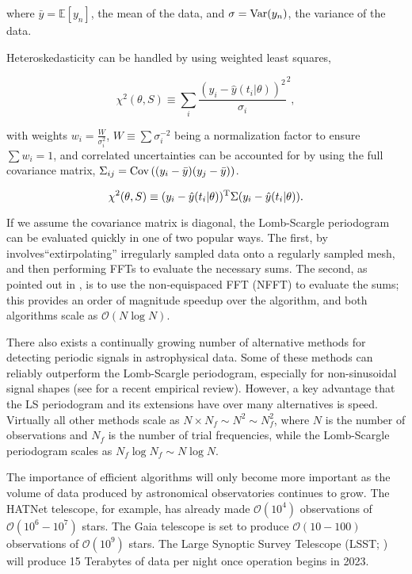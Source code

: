 \documentclass[iop]{emulateapj}
\newcommand{\bigO}{\mathcal{O}}
\begin{document}
\noindent where $\bar{y} = \mathbb{E}[y_n]$, the mean of the data, and 
$\sigma = {\rm Var}(y_n)$, the variance of the data. 

Heteroskedasticity can be handled by using weighted least squares, 

\begin{equation}
\chi^2(\theta, S) \equiv \sum_i \frac{(y_i - \hat{y}(t_i|\theta) )^2}{\sigma_i}^2,
\end{equation}

\noindent with weights $w_i = \frac{W}{\sigma_i^2}$, $W\equiv\sum \sigma_i^{-2}$ being
a normalization factor to ensure $\sum w_i = 1$, and correlated uncertainties
can be accounted for by using the full covariance matrix, $\Sigma_{ij} = {\rm Cov}\left((y_i - \bar{y})(y_j - \bar{y})\right)$.

\begin{equation}
\chi^2(\theta, S) \equiv (y_i - \hat{y}(t_i|\theta) )^{\rm T}\Sigma(y_i - \hat{y}(t_i|\theta) ).
\end{equation}

If we assume the covariance matrix is diagonal, the Lomb-Scargle periodogram can be
evaluated quickly in one of two popular ways. The first, by \cite{Press+Rybicki_1989}
involves``extirpolating'' irregularly sampled data onto a regularly sampled mesh,
and then performing FFTs to evaluate the necessary sums. The second, as pointed
out in \cite{Leroy_2012}, is to use the non-equispaced FFT (NFFT) \cite{NFFT} to evaluate
the sums; this provides an order of magnitude speedup over the \cite{Press+Rybicki_1989}
algorithm, and both algorithms scale as $\bigO(N\log N)$.

There also exists a continually growing number of alternative methods for detecting
periodic signals in astrophysical data. Some of these methods can reliably
outperform the Lomb-Scargle periodogram, especially for non-sinusoidal signal shapes
(see \cite{Graham_etal_2013} for a recent empirical review). However, a key advantage
that the LS periodogram and its extensions have over many alternatives is speed.
Virtually all other methods scale as $N\times N_f \sim N^2\sim N_f^2$, where $N$ is the number
of observations and $N_f$ is the number of trial frequencies, while the Lomb-Scargle
periodogram scales as $N_f\log N_f \sim N\log N$.

The importance of efficient algorithms will only become more important as the volume
of data produced by astronomical observatories continues to grow. The HATNet telescope,
for example, has already made $\bigO(10^4)$ observations of $\bigO(10^6-10^7)$ stars. 
The Gaia telescope \citep{GAIA} is set to produce $\bigO(10-100)$ observations of 
$\bigO(10^9)$ stars. The Large Synoptic Survey Telescope (LSST; \cite{LSST}) will 
produce 15 Terabytes of data per night once operation begins in 2023.
\end{document}
